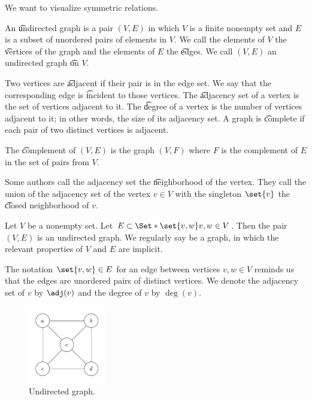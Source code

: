 
We want to visualize symmetric relations.


An \t{undirected graph} is a pair $(V, E)$ in which $V$ is a finite nonempty set and $E$ is a subset of unordered pairs of elements in $V$.
We call the elements of $V$ the \t{vertices} of the graph and the elements of $E$ the \t{edges}.
We call $(V, E)$ an undirected graph \t{on} $V$.

Two vertices are \t{adjacent} if their pair is in the edge set.
We say that the corresponding edge is \t{incident} to those vertices.
The \t{adjacency set} of a vertex is the set of vertices adjacent to it.
The \t{degree} of a vertex is the number of vertices adjacent to it; in other words, the size of its adjacency set.
A graph is \t{complete} if each pair of two distinct vertices is adjacent.

The \t{complement} of $(V, E)$ is the graph $(V, F)$ where $F$ is the complement of $E$ in the set of pairs from $V$.


Some authors call the adjacency set the \t{neighborhood} of the vertex.
They call the union of the adjacency set of the vertex $v \in V$ with the singleton $\set{v}$ the \t{closed neighborhood} of $v$.


Let $V$ be a nonempty set.
Let $E \subset \Set*{\set{v, w}}{v, w \in V}$.
Then the pair $(V, E)$ is an undirected graph.
We regularly say  be a graph, in which the relevant properties of $V$ and $E$ are implicit.

The notation $\set{v, w} \in E$ for an edge between vertices $v, w \in V$ reminds us that the edges are unordered pairs of distinct vertices.
We denote the adjacency set of $v$ by $\adj(v)$ and the degree of $v$ by $\deg(v)$.


\begin{figure}
\centering
\includegraphics[width=0.3\textwidth]{graphics_included/undirected_graph}
\caption{Undirected graph.}
\end{figure}

